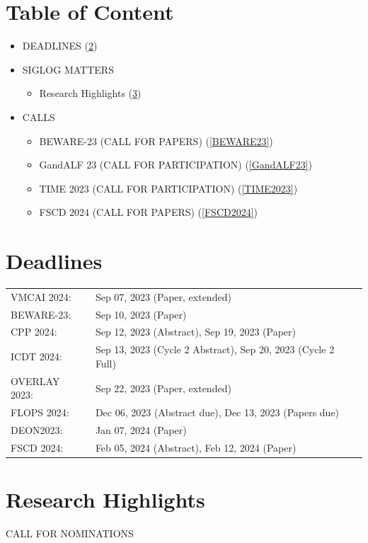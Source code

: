 \documentclass[prodmode,acmtecs]{acmsmall} %
\begin{document}
\section{Table of Content}\begin{itemize}\item DEADLINES (\cref{deadlines}) 
 
\item SIGLOG MATTERS 
 
\begin{itemize}\item Research Highlights (\cref{ResearchHighlights})
\end{itemize} 
\item CALLS 
 
\begin{itemize}\item BEWARE-23 (CALL FOR PAPERS) (\cref{BEWARE23})
\item GandALF 23 (CALL FOR PARTICIPATION) (\cref{GandALF23})
\item TIME 2023 (CALL FOR PARTICIPATION) (\cref{TIME2023})
\item FSCD 2024 (CALL FOR PAPERS) (\cref{FSCD2024})
\end{itemize} 
\end{itemize}\section{Deadlines}\label{deadlines}\begin{tabulary}{\linewidth}{LL}VMCAI 2024:  & Sep 07, 2023 (Paper, extended) \\
BEWARE-23:  & Sep 10, 2023 (Paper) \\
CPP 2024:  & Sep 12, 2023 (Abstract), Sep 19, 2023 (Paper) \\
ICDT 2024:  & Sep 13, 2023 (Cycle 2 Abstract), Sep 20, 2023 (Cycle 2 Full) \\
OVERLAY 2023:  & Sep 22, 2023 (Paper, extended) \\
FLOPS 2024:  & Dec 06, 2023 (Abstract due), Dec 13, 2023 (Papers due) \\
DEON2023:  & Jan 07, 2024 (Paper) \\
FSCD 2024:  & Feb 05, 2024 (Abstract), Feb 12, 2024 (Paper) \\
\end{tabulary}
\section{Research Highlights}\label{ResearchHighlights}CALL FOR NOMINATIONS 
\end{document}
